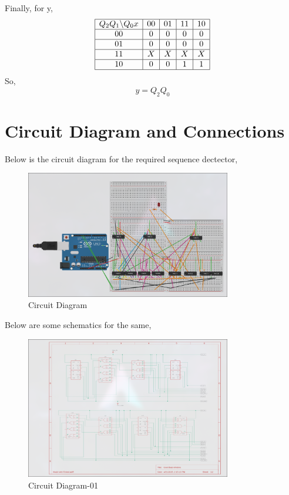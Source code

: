 \documentclass[a4paper,12pt]{article}
\begin{document}
Finally, for y,
\[
\begin{array}{|c|c|c|c|c|}
\hline
Q_2 Q_1 \backslash Q_0 x & 00 & 01 & 11 & 10 \\
\hline
00 & 0 & 0 & 0 & 0 \\
\hline
01 & 0 & 0 & 0 & 0 \\
\hline
11 & X & X & X & X \\
\hline
10 & 0 & 0 & 1 & 1 \\
\hline
\end{array}
\]
So,
\[
\boxed{y = Q_2Q_0}
\]

\section{Circuit Diagram and Connections}
Below is the circuit diagram for the required sequence dectector,
\begin{figure}[H]
    \centering
    \includegraphics[width=0.8\textwidth]{figs/diagram.png}
    \caption{Circuit Diagram}
    \label{fig:your_image_label}
\end{figure}
\newpage
Below are some schematics for the same,
\begin{figure}[H]
    \centering
    \includegraphics[width=0.8\textwidth]{figs/scheme1.png}
    \caption{Circuit Diagram-01}
    \label{fig:your_image_label}
\end{figure}
\end{document}

